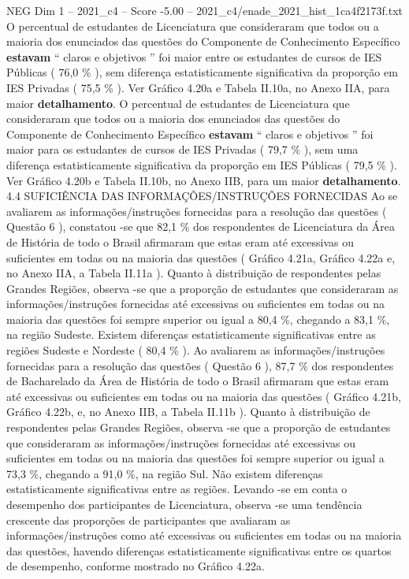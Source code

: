 \begin{textsample}{NEG Dim 1 – 2021\_c4 – Score -5.00 – 2021\_c4/enade\_2021\_hist\_1ca4f2173f.txt}
O percentual de estudantes de Licenciatura que consideraram que todos ou a maioria dos enunciados das questões do Componente de Conhecimento Específico \textbf{estavam} “ claros e objetivos ” foi maior entre os estudantes de cursos de IES Públicas ( 76,0 \% ), sem diferença estatisticamente significativa da proporção em IES Privadas ( 75,5 \% ).
Ver Gráfico 4.20a e Tabela II.10a, no Anexo IIA, para maior \textbf{detalhamento}.
O percentual de estudantes de Licenciatura que consideraram que todos ou a maioria dos enunciados das questões do Componente de Conhecimento Específico \textbf{estavam} “ claros e objetivos ” foi maior para os estudantes de cursos de IES Privadas ( 79,7 \% ), sem uma diferença estatisticamente significativa da proporção em IES Públicas ( 79,5 \% ).
Ver Gráfico 4.20b e Tabela II.10b, no Anexo IIB, para um maior \textbf{detalhamento}. 4.4 SUFICIÊNCIA DAS INFORMAÇÕES/INSTRUÇÕES FORNECIDAS Ao se avaliarem as informações/instruções fornecidas para a resolução das questões ( Questão 6 ), constatou -se que 82,1 \% dos respondentes de Licenciatura da Área de História de todo o Brasil afirmaram que estas eram até excessivas ou suficientes em todas ou na maioria das questões ( Gráfico 4.21a, Gráfico 4.22a e, no Anexo IIA, a Tabela II.11a ).
Quanto à distribuição de respondentes pelas Grandes Regiões, observa -se que a proporção de estudantes que consideraram as informações/instruções fornecidas até excessivas ou suficientes em todas ou na maioria das questões foi sempre superior ou igual a 80,4 \%, chegando a 83,1 \%, na região Sudeste.
Existem diferenças estatisticamente significativas entre as regiões Sudeste e Nordeste ( 80,4 \% ).
Ao avaliarem as informações/instruções fornecidas para a resolução das questões ( Questão 6 ), 87,7 \% dos respondentes de Bacharelado da Área de História de todo o Brasil afirmaram que estas eram até excessivas ou suficientes em todas ou na maioria das questões ( Gráfico 4.21b, Gráfico 4.22b, e, no Anexo IIB, a Tabela II.11b ).
Quanto à distribuição de respondentes pelas Grandes Regiões, observa -se que a proporção de estudantes que consideraram as informações/instruções fornecidas até excessivas ou suficientes em todas ou na maioria das questões foi sempre superior ou igual a 73,3 \%, chegando a 91,0 \%, na região Sul.
Não existem diferenças estatisticamente significativas entre as regiões.
Levando -se em conta o desempenho dos participantes de Licenciatura, observa -se uma tendência crescente das proporções de participantes que avaliaram as informações/instruções como até excessivas ou suficientes em todas ou na maioria das questões, havendo diferenças estatisticamente significativas entre os quartos de desempenho, conforme mostrado no Gráfico 4.22a.

\end{textsample}
